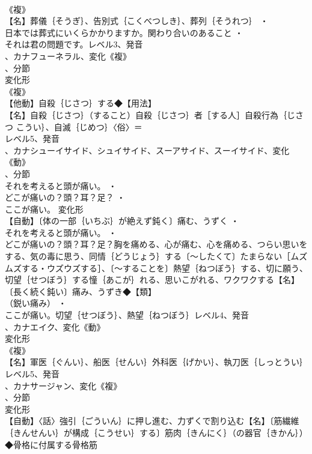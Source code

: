 \documentclass[8pt]{extreport}
\begin{document}
\begin{CJK}{UTF8}{min}
\\	《複》
\\	【名】葬儀｛そうぎ｝、告別式｛こくべつしき｝、葬列｛そうれつ｝ ・
\\	日本では葬式にいくらかかりますか。関わり合いのあること ・
\\	それは君の問題です。レベル3、発音
\\	、カナフューネラル、変化《複》
\\	、分節
\\	変化形 
\\	《複》
\\	【他動】自殺｛じさつ｝する◆【用法】
\\	【名】自殺｛じさつ｝（すること）自殺｛じさつ｝者［する人］自殺行為｛じさつ こうい｝、自滅｛じめつ｝〈俗〉＝
\\	レベル5、発音
\\	、カナシューイサイド、シュイサイド、スーアサイド、スーイサイド、変化《動》
\\	、分節
\\	それを考えると頭が痛い。 ・
\\	どこが痛いの？頭？耳？足？ ・
\\	ここが痛い。	変化形 
\\	【自動】〔体の一部｛いちぶ｝が絶えず鈍く〕痛む、うずく ・
\\	それを考えると頭が痛い。 ・
\\	どこが痛いの？頭？耳？足？胸を痛める、心が痛む、心を痛める、つらい思いをする、気の毒に思う、同情｛どうじょう｝する〔～したくて〕たまらない［ムズムズする・ウズウズする］、〔～することを〕熱望｛ねつぼう｝する、切に願う、切望｛せつぼう｝する憧｛あこが｝れる、思いこがれる、ワクワクする【名】〔長く続く鈍い〕痛み、うずき◆【類】
\\	（鋭い痛み） ・
\\	ここが痛い。切望｛せつぼう｝、熱望｛ねつぼう｝レベル4、発音
\\	、カナエイク、変化《動》
\\	変化形 
\\	《複》
\\	【名】軍医｛ぐんい｝、船医｛せんい｝外科医｛げかい｝、執刀医｛しっとうい｝レベル5、発音
\\	、カナサージャン、変化《複》
\\	、分節
\\	変化形 
\\	【自動】〈話〉強引｛ごういん｝に押し進む、力ずくで割り込む【名】〔筋繊維｛きんせんい｝が構成｛こうせい｝する〕筋肉｛きんにく｝（の器官｛きかん｝）◆骨格に付属する骨格筋

\end{CJK}
\end{document}
